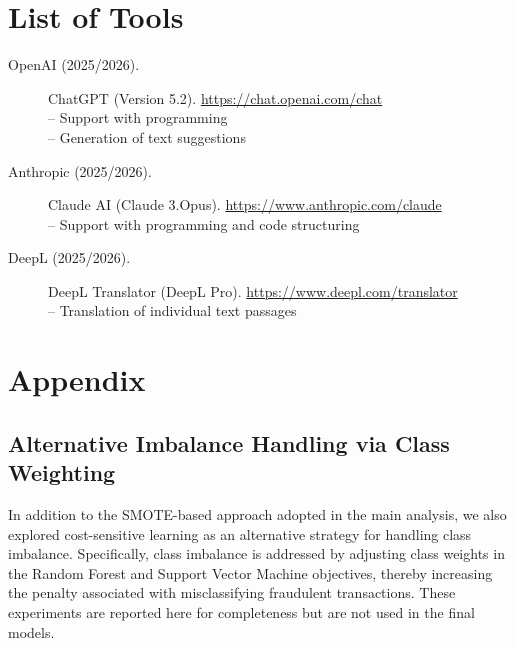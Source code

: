 \documentclass[oneside,12pt,parskip=half,american,numbers=noenddot]{scrreprt}
\begin{document}
\cleardoublepage
{}
\setcounter{page}{1}

\printbibliography
{} %


\chapter*{List of Tools}
\begin{description}
  \item[OpenAI (2025/2026).] ChatGPT (Version 5.2). \url{https://chat.openai.com/chat} \\
  – Support with programming \\
  – Generation of text suggestions

  \item[Anthropic (2025/2026).] Claude AI (Claude 3.Opus). \url{https://www.anthropic.com/claude} \\
  – Support with programming and code structuring

  \item[DeepL (2025/2026).] DeepL Translator (DeepL Pro). \url{https://www.deepl.com/translator} \\
  – Translation of individual text passages
\end{description}


\appendix
\chapter{Appendix}

\section{Alternative Imbalance Handling via Class Weighting}
\label{app:class_weighting}

In addition to the SMOTE-based approach adopted in the main analysis, we also explored cost-sensitive learning as an alternative strategy for handling class imbalance. Specifically, class imbalance is addressed by adjusting class weights in the Random Forest and Support Vector Machine objectives, thereby increasing the penalty associated with misclassifying fraudulent transactions. These experiments are reported here for completeness but are not used in the final models.
\end{document}
